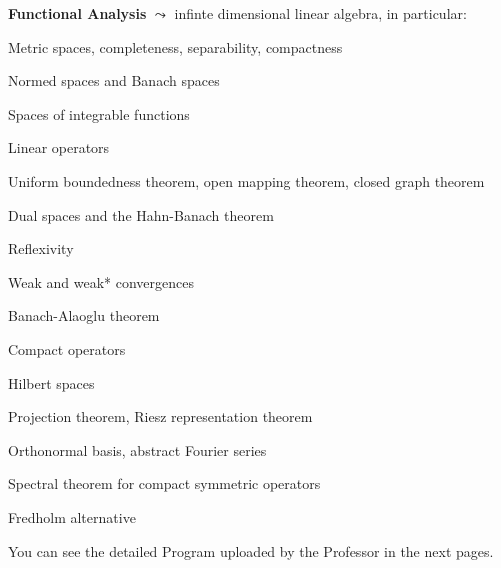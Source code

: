 \begin{enumerate}
{	\item[2)] \textbf{Functional Analysis} $\leadsto$ infinte dimensional linear algebra, in particular:
	\begin{itemize}{
		\item Metric spaces, completeness, separability, compactness
		\item Normed spaces and Banach spaces
		\item Spaces of integrable functions
		\item Linear operators
		\item Uniform boundedness theorem, open mapping theorem, closed graph theorem
		\item Dual spaces and the Hahn-Banach theorem
		\item Reflexivity
		\item Weak and weak* convergences
		\item Banach-Alaoglu theorem
		\item Compact operators
		\item Hilbert spaces
		\item Projection theorem, Riesz representation theorem
		\item Orthonormal basis, abstract Fourier series
		\item Spectral theorem for compact symmetric operators
		\item Fredholm alternative
	}
	\end{itemize}
}
\end{enumerate}

\bigskip
\bigskip
\bigskip

You can see the detailed Program uploaded by the Professor in the next pages.

\newpage


